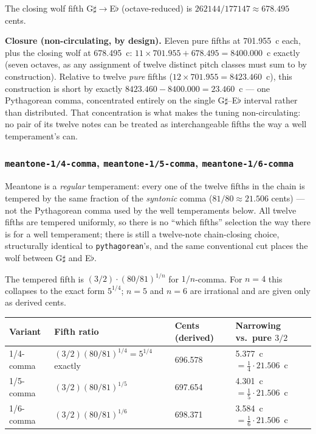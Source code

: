 \documentclass[11pt,letterpaper]{report}
\begin{document}
The closing wolf fifth G$\sharp\to$E$\flat$ (octave-reduced) is
$262144/177147 \approx 678.495$ cents.

\textbf{Closure (non-circulating, by design).} Eleven pure fifths at
701.955~c each, plus the closing wolf at 678.495~c:
$11 \times 701.955 + 678.495 = 8400.000$~c exactly (seven octaves, as
any assignment of twelve distinct pitch classes must sum to by
construction). Relative to twelve
\emph{pure} fifths ($12 \times 701.955 = 8423.460$~c), this construction
is short by exactly $8423.460 - 8400.000 = 23.460$~c --- one Pythagorean
comma, concentrated entirely on the single G$\sharp$--E$\flat$ interval
rather than distributed. That concentration is what makes the tuning
non-circulating: no pair of its twelve notes can be treated as
interchangeable fifths the way a well temperament's can.

\subsubsection{\texttt{meantone-1/4-comma}, \texttt{meantone-1/5-comma}, \texttt{meantone-1/6-comma}}

Meantone is a \emph{regular} temperament: every one of the twelve fifths
in the chain is tempered by the same fraction of the \emph{syntonic}
comma ($81/80 \approx 21.506$ cents) --- not the Pythagorean comma used
by the well temperaments below. All twelve fifths are tempered
uniformly, so there is no ``which fifths'' selection the way there is
for a well temperament; there is still a twelve-note chain-closing
choice, structurally identical to \texttt{pythagorean}'s, and the same
conventional cut places the wolf between G$\sharp$ and E$\flat$.

The tempered fifth is $(3/2) \cdot (80/81)^{1/n}$ for $1/n$-comma. For
$n=4$ this collapses to the exact form $5^{1/4}$; $n=5$ and $n=6$ are
irrational and are given only as derived cents.

\begin{longtable}{p{2.6cm} p{4.2cm} p{2.8cm} p{3.6cm}}
  \toprule
  \textbf{Variant} & \textbf{Fifth ratio} & \textbf{Cents (derived)} &
  \textbf{Narrowing vs.\ pure $3/2$} \\
  \midrule
  \endhead
  1/4-comma & $(3/2)(80/81)^{1/4} = 5^{1/4}$ exactly & 696.578 &
    5.377~c $= \tfrac{1}{4} \cdot 21.506$~c \\
  1/5-comma & $(3/2)(80/81)^{1/5}$ & 697.654 &
    4.301~c $= \tfrac{1}{5} \cdot 21.506$~c \\
  1/6-comma & $(3/2)(80/81)^{1/6}$ & 698.371 &
    3.584~c $= \tfrac{1}{6} \cdot 21.506$~c \\
  \bottomrule
\end{longtable}
\end{document}
